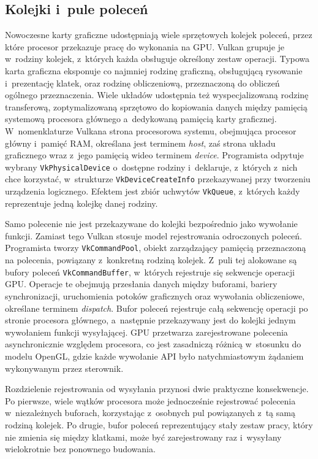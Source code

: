 \subsection{Kolejki i~pule poleceń}

Nowoczesne karty graficzne udostępniają wiele sprzętowych kolejek poleceń, przez które
procesor przekazuje pracę do wykonania na GPU. Vulkan grupuje je w~rodziny kolejek, 
z~których każda obsługuje określony zestaw operacji. Typowa karta graficzna eksponuje co 
najmniej rodzinę graficzną, obsługującą rysowanie i~prezentację klatek, oraz rodzinę obliczeniową, 
przeznaczoną do obliczeń ogólnego przeznaczenia. Wiele układów udostępnia też 
wyspecjalizowaną rodzinę transferową, zoptymalizowaną sprzętowo do kopiowania danych
między pamięcią systemową procesora głównego a~dedykowaną pamięcią karty graficznej.
W~nomenklaturze Vulkana strona procesorowa systemu, obejmująca procesor główny i~pamięć RAM,
określana jest terminem \textit{host}, zaś strona układu graficznego wraz z~jego pamięcią
wideo terminem \textit{device}.
Programista odpytuje wybrany \texttt{VkPhysicalDevice} o~dostępne rodziny i~deklaruje,
z~których z~nich chce korzystać, w~strukturze \texttt{VkDeviceCreateInfo} przekazywanej
przy tworzeniu urządzenia logicznego. Efektem jest zbiór uchwytów \texttt{VkQueue},
z~których każdy reprezentuje jedną kolejkę danej rodziny.

Samo polecenie nie jest przekazywane do kolejki bezpośrednio jako wywołanie funkcji.
Zamiast tego Vulkan stosuje model rejestrowania odroczonych poleceń. Programista tworzy
\texttt{VkCommandPool}, obiekt zarządzający pamięcią przeznaczoną na polecenia, powiązany
z~konkretną rodziną kolejek. Z~puli tej alokowane są bufory poleceń \texttt{VkCommandBuffer},
w~których rejestruje się sekwencje operacji GPU. Operacje te obejmują przesłania danych
między buforami, bariery synchronizacji, uruchomienia potoków graficznych oraz wywołania
obliczeniowe, określane terminem \textit{dispatch}. Bufor poleceń rejestruje całą sekwencję
operacji po stronie procesora głównego, a~następnie przekazywany jest do kolejki jednym
wywołaniem funkcji wysyłającej. GPU przetwarza zarejestrowane polecenia asynchronicznie
względem procesora, co jest zasadniczą różnicą w~stosunku do modelu OpenGL, gdzie każde
wywołanie API było natychmiastowym żądaniem wykonywanym przez sterownik.

Rozdzielenie rejestrowania od wysyłania przynosi dwie praktyczne konsekwencje. Po pierwsze,
wiele wątków procesora może jednocześnie rejestrować polecenia w~niezależnych buforach,
korzystając z~osobnych pul powiązanych z~tą samą rodziną kolejek. Po drugie, bufor poleceń
reprezentujący stały zestaw pracy, który nie zmienia się między klatkami, może być
zarejestrowany raz i~wysyłany wielokrotnie bez ponownego budowania.

